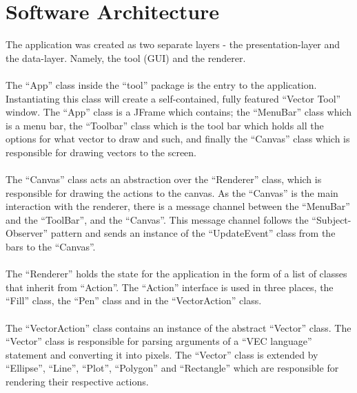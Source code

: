 \section{Software Architecture}

The application was created as two separate layers - the presentation-layer and the data-layer.
Namely, the tool (GUI) and the renderer.
\\\\
The ``App'' class inside the ``tool'' package is the entry to the application.
Instantiating this class will create a self-contained, fully featured ``Vector Tool'' window.
The ``App'' class is a JFrame which contains;
the ``MenuBar'' class which is a menu bar,
the ``Toolbar'' class which is the tool bar which holds all the options for what vector to draw and such,
and finally the ``Canvas'' class which is responsible for drawing vectors to the screen.
\\\\
The ``Canvas'' class acts an abstraction over the ``Renderer'' class, which is responsible for drawing the actions to the canvas.
As the ``Canvas'' is the main interaction with the renderer, there is a message channel between the ``MenuBar'' and the ``ToolBar'', and the ``Canvas''.
This message channel follows the ``Subject-Observer'' pattern and sends an instance of the ``UpdateEvent'' class from the bars to the ``Canvas''.
\\\\
The ``Renderer'' holds the state for the application in the form of a list of classes that inherit from ``Action''.
The ``Action'' interface is used in three places, the ``Fill'' class, the ``Pen'' class and in the ``VectorAction'' class.
\\\\
The ``VectorAction'' class contains an instance of the abstract ``Vector'' class.
The ``Vector'' class is responsible for parsing arguments of a ``VEC language'' statement and converting it into pixels.
The ``Vector'' class is extended by ``Ellipse'', ``Line'', ``Plot'', ``Polygon'' and ``Rectangle'' which are responsible for rendering their respective actions.
